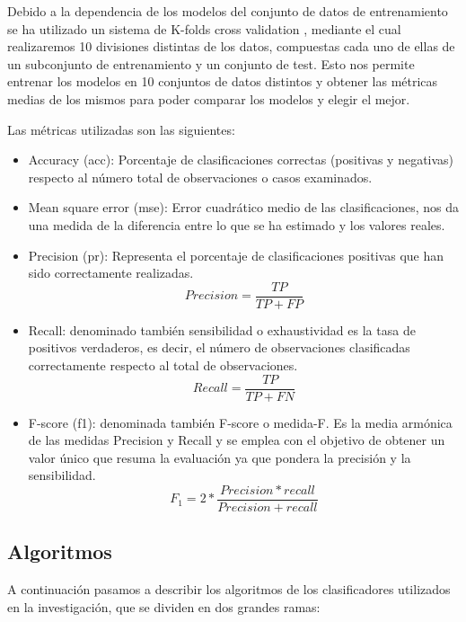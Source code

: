 Debido a la dependencia de los modelos del conjunto de datos de entrenamiento se ha utilizado un sistema de K-folds cross validation \cite{kfold}, mediante el cual realizaremos 10 divisiones distintas de los datos, compuestas cada uno de ellas de un subconjunto de entrenamiento y un conjunto de test. Esto nos permite entrenar los modelos en 10 conjuntos de datos distintos y obtener las métricas medias de los mismos para poder comparar los modelos y elegir el mejor.

Las métricas utilizadas son las siguientes:

\begin{itemize}
\item Accuracy (acc): Porcentaje de clasificaciones correctas (positivas y negativas) respecto al número total de observaciones o casos examinados.
\item Mean square error (mse): Error cuadrático medio de las clasificaciones, nos da una medida de la diferencia entre lo que se ha estimado y los valores reales.
\item Precision (pr): Representa el porcentaje de clasificaciones positivas que han sido correctamente realizadas.
\begin{equation}
	Precision = \frac{TP}{TP + FP}
\end{equation}
\item Recall: denominado también sensibilidad o exhaustividad es la tasa de positivos verdaderos, es decir, el número de observaciones clasificadas correctamente respecto al total de observaciones.
\begin{equation}
	Recall = \frac{TP}{TP + FN}
\end{equation}
\item F-score (f1): denominada también F-score o medida-F. Es la media armónica de las medidas Precision y Recall y se emplea con el objetivo de obtener un valor único que resuma la evaluación ya que pondera la precisión y la sensibilidad.
\begin{equation}
	F_{1} = 2 * \frac{Precision * recall}{Precision + recall}
\end{equation}
\end{itemize} 


\subsection{Algoritmos}\label{alg}

A continuación pasamos a describir los algoritmos de los clasificadores utilizados en la investigación, que se dividen en dos grandes ramas:

